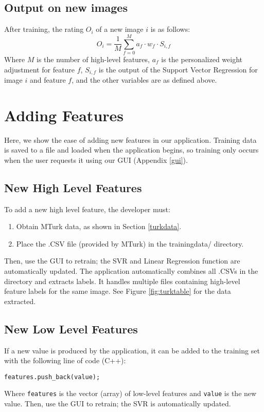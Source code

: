 \documentclass[11pt,letter]{article}
\begin{document}
\subsection{Output on new images}
After training, the rating $O_i$ of a new image $i$ is as follows:
\[
O_i=\frac{1}{M}\displaystyle\sum\limits_{f=0}^Ma_f \cdot w_f \cdot S_{i,f}
\]
Where $M$ is the number of high-level features, $a_f$ is the personalized weight adjustment for feature $f$, $S_{i,f}$ is the output of the Support Vector Regression for image $i$ and feature $f$, and the other variables are as defined above.

\section{Adding Features}
Here, we show the ease of adding new features in our application. Training data is saved to a file and loaded when the application begins, so training only occurs when the user requests it using our GUI (Appendix \ref{gui}).

\subsection{New High Level Features}
To add a new high level feature, the developer must:

\begin{enumerate}
\item Obtain MTurk data, as shown in Section \ref{turkdata}.
\item Place the .CSV file (provided by MTurk) in the trainingdata/ directory.
\end{enumerate}

Then, use the GUI to retrain; the SVR and Linear Regression function are automatically updated. The application automatically combines all .CSVs in the directory and extracts labels. It handles multiple files containing high-level feature labels for the same image. See Figure \ref{fig:turktable} for the data extracted.

\subsection{New Low Level Features}
If a new value is produced by the application, it can be added to the training set with the following line of code (C++):

\texttt{features.push\_back(value);}

Where \texttt{features} is the vector (array) of low-level features and \texttt{value} is the new value. Then, use the GUI to retrain; the SVR is automatically updated.
\end{document}
